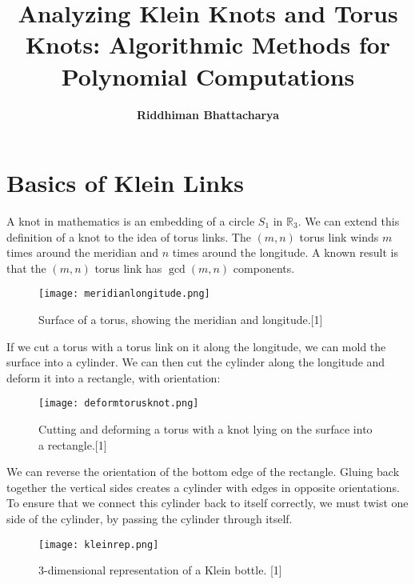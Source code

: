 \documentclass[12pt]{article}
\begin{document}
 
 
\title{\Huge \textbf{Analyzing Klein Knots and Torus Knots: Algorithmic Methods for Polynomial Computations}}

\author{\textbf{Riddhiman Bhattacharya}}

\maketitle

\section{Basics of Klein Links}

A knot in mathematics is an embedding of a circle $S_1$ in $\mathbb{R}_3$. We can extend this definition of a knot to the idea of torus links. The $(m, n)$ torus link winds $m$ times around the meridian and $n$ times around the longitude. A known result is that the $(m,n)$ torus link has $\gcd(m,n)$ components.

\begin{figure}[H]
\centering
\texttt{[image: meridianlongitude.png]}
\caption{\label{Torus} Surface of a torus, showing the meridian and longitude.[1]}
\end{figure}

If we cut a torus with a torus link on it along the longitude, we can mold the surface into a cylinder. We can then cut the cylinder along the longitude and deform it into a rectangle, with orientation:



\begin{figure}[H]
\centering
\texttt{[image: deformtorusknot.png]}
\caption{\label{Klein knot formation p1} Cutting and deforming a torus with a knot lying on the surface into a rectangle.[1]}
\end{figure}


We can reverse the orientation of the bottom edge of the rectangle. Gluing back together the vertical sides creates a cylinder with edges in opposite orientations. To ensure that we connect this cylinder back to itself correctly, we must twist one side of the cylinder, by passing the cylinder through itself. 

\begin{figure}[H]
\centering
\texttt{[image: kleinrep.png]}
\caption{\label{Klein bottle representation} 3-dimensional representation of a Klein bottle. [1]}
\end{figure}
\end{document}
